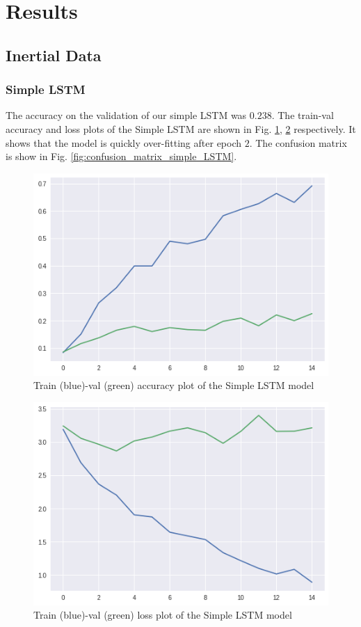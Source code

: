 \documentclass[conference]{IEEEtran}
\begin{document}
\section{Results}
\subsection{Inertial Data}
\subsubsection{Simple LSTM}
The accuracy on the validation of our simple LSTM was $0.238$. The train-val accuracy and loss plots of the Simple LSTM are shown in Fig. \ref{fig:train_val_acc_simple_LSTM}, \ref{fig:train_val_loss_simple_LSTM} respectively. It shows that the model is quickly over-fitting after epoch $2$. The confusion matrix is show in Fig. \ref{fig:confusion_matrix_simple_LSTM}. 
\begin{figure}[H]
\begin{center}
\includegraphics[scale=0.4]{simple_LSTM/simpleLSTM_acc_plot.png}
\end{center}
\caption{\label{fig:train_val_acc_simple_LSTM} 
Train (blue)-val (green) accuracy plot of the Simple LSTM model}
\end{figure}
\begin{figure}[H]
\begin{center}
\includegraphics[scale=0.4]{simple_LSTM/simpleLSTM_loss_plot.png}
\end{center}
\caption{\label{fig:train_val_loss_simple_LSTM} 
Train (blue)-val (green) loss plot of the Simple LSTM model}
\end{figure}
\end{document}
